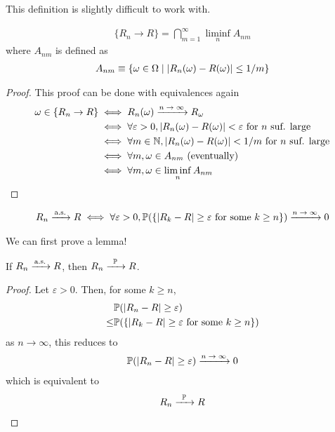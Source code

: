 This definition is slightly difficult to work with.
\begin{proposition}
    \begin{align}
        \{ R_n \to R \} = \bigcap_{m=1}^\infty \liminf_n A_{nm}
    \end{align}
    where $A_{nm}$ is defined as
    \begin{align}
        A_{nm} \equiv \{ \omega \in \Omega \mid \abs{R_n(\omega) - R(\omega)} \le 1/m \}
    \end{align}
\end{proposition}
\begin{proof}
    This proof can be done with equivalences again
    \begin{align}
        \omega \in \{ R_n \to R \}
        &\iff R_n(\omega) \ce{->[$n \to \infty$]} R_\omega\\
        &\iff \forall \varepsilon > 0, \abs{R_n(\omega) - R(\omega)} < \varepsilon \text{ for $n$ suf. large}\\
        &\iff \forall m \in \natural, \abs{R_n(\omega) - R(\omega)} < 1/m \text{ for $n$ suf. large}\\
        &\iff \forall m, \omega \in A_{nm} \text{ (eventually)}\\
        &\iff \forall m, \omega \in \liminf_n A_{nm}
    \end{align}
\end{proof}

\begin{proposition}
    \begin{align*}
        R_n \ce{->[\text{a.s.}]} R \iff \forall \varepsilon > 0, \probability\qty(\{ \abs{R_k - R} \ge \varepsilon \text{ for some $k \ge n$}\}) \ce{->[$n \to \infty$]} 0
    \end{align*}
\end{proposition}
We can first prove a lemma!
\begin{lemma}
    If $R_n \ce{->[\text{a.s.}]} R$, then $R_n \ce{->[$\probability$]} R$.
\end{lemma}
\begin{proof}
    Let $\varepsilon > 0$. Then, for some $k \ge n$,
    \begin{align}
        &\mathbb{P}(\abs{R_n - R} \ge \varepsilon)\\
        \le &\mathbb{P}(\{ \abs{R_k - R} \ge \varepsilon \text{ for some $k \ge n$} \})
    \end{align}
    as $n\to\infty$, this reduces to
    \begin{align}
        \probability(\abs{R_n - R} \ge \varepsilon) \ce{->[$n \to \infty$]} 0
    \end{align}
    which is equivalent to
    \begin{align}
        R_n \ce{->[$\probability$]} R
    \end{align}
\end{proof}

